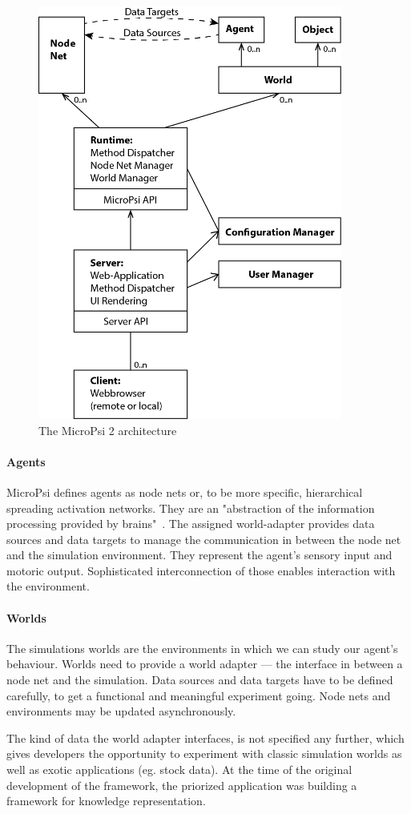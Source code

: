 \begin{figure}[h]
  \centering
    \includegraphics[width=10cm]{graphics/micropsi2_uml}
  \caption{The MicroPsi 2 architecture~\cite{conf/agi/Bach12}}
  \label{micropsi2_modules}
\end{figure}
            
        \paragraph{Agents}
MicroPsi defines agents as node nets or, to be more specific, hierarchical spreading activation networks. They are an "abstraction of the information processing provided by brains"~\cite{conf/agi/Bach12}. The assigned world-adapter provides data sources and data targets to manage the communication in between the node net and the simulation environment. They represent the agent's sensory input and motoric output. Sophisticated interconnection of those enables interaction with the environment.~\cite{conf/agi/Bach12}
       
        \paragraph{Worlds}
The simulations worlds are the environments in which we can study our agent's behaviour. Worlds need to provide a world adapter --- the interface in between a node net and the simulation. Data sources and data targets have to be defined carefully, to get a functional and meaningful experiment going. Node nets and environments may be updated asynchronously.~\cite{conf/agi/Bach12}

The kind of data the world adapter interfaces, is not specified any further, which gives developers the opportunity to experiment with classic simulation worlds as well as exotic applications (eg. stock data). At the time of the original development of the framework, the priorized application was building a framework for knowledge representation.~\cite{conf/agi/Bach12}

